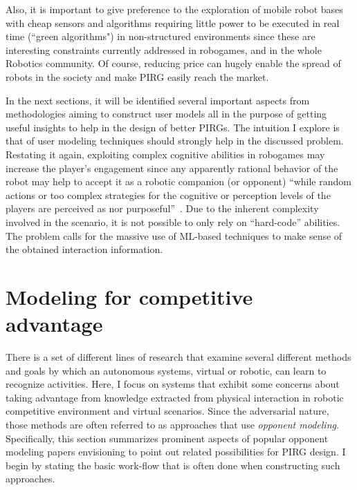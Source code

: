 Also, it is important to give preference to the exploration of mobile robot bases with cheap sensors and algorithms requiring little power to be executed in real time (``green algorithms") in non-structured environments since these are interesting constraints currently addressed in robogames, and in the whole Robotics community. Of course, reducing price can hugely enable the spread of robots in the society and make PIRG easily reach the market. 

In the next sections, it will be identified several important aspects from methodologies aiming to construct user models all in the purpose of getting useful insights to help in the design of better PIRGs. The intuition I explore is that of user modeling techniques should strongly help in the discussed problem. Restating it again, exploiting complex cognitive abilities in robogames may increase the player's engagement since any apparently rational behavior of the robot may help to accept it as a robotic companion (or opponent) ``while random actions or too complex strategies for the cognitive or perception levels of the players are perceived as nor purposeful''~\cite{martinoia_physically_2013}. Due to the inherent complexity involved in the scenario, it is not possible to only rely on ``hard-code'' abilities. The problem calls for the massive use of ML-based techniques to make sense of the obtained interaction information. 

\section{Modeling for competitive advantage}\label{compadvantage}
There is a set of different lines of research that examine several different methods and goals by which an autonomous systems, virtual or robotic, can learn to recognize activities. Here, I focus on systems that exhibit some concerns about taking advantage from knowledge extracted from physical interaction in robotic competitive environment and virtual scenarios. Since the adversarial nature, those methods are often referred to as approaches that use \textit{opponent modeling}.  Specifically, this section summarizes prominent aspects of popular opponent modeling papers envisioning to point out related possibilities for PIRG design. I begin by stating the basic work-flow that is often done when constructing such approaches. 


